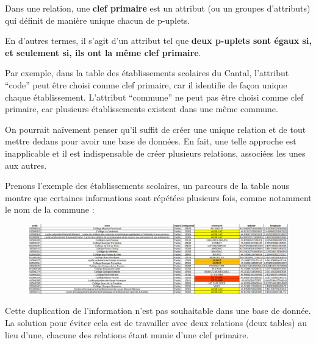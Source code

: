 \documentclass[
  a4paper,
  DIV=11,
  numbers=noendperiod]{scrartcl}
\begin{document}
\begin{tcolorbox}[enhanced jigsaw, opacityback=0, leftrule=.75mm, toptitle=1mm, toprule=.15mm, arc=.35mm, rightrule=.15mm, bottomtitle=1mm, title=\textcolor{quarto-callout-tip-color}{\faLightbulb}\hspace{0.5em}{Définition}, colbacktitle=quarto-callout-tip-color!10!white, titlerule=0mm, coltitle=black, left=2mm, opacitybacktitle=0.6, bottomrule=.15mm, breakable, colback=white]

Dans une relation, une \textbf{clef primaire} est un attribut (ou un
groupes d'attributs) qui définit de manière unique chacun de p-uplets.

\end{tcolorbox}

En d'autres termes, il s'agit d'un attribut tel que \textbf{deux
p-uplets sont égaux si, et seulement si, ils ont la même clef primaire}.

Par exemple, dans la table des établissements scolaires du Cantal,
l'attribut ``code'' peut être choisi comme clef primaire, car il
identifie de façon unique chaque établissement. L'attribut ``commune''
ne peut pas être choisi comme clef primaire, car plusieurs
établissements existent dans une même commune.

On pourrait naïvement penser qu'il suffit de créer une unique relation
et de tout mettre dedans pour avoir une base de données. En fait, une
telle approche est inapplicable et il est indispensable de créer
plusieurs relations, associées les unes aux autres.

Prenons l'exemple des établissements scolaires, un parcours de la table
nous montre que certaines informations sont répétées plusieurs fois,
comme notamment le nom de la commune :

\begin{figure}

{\centering \includegraphics{BDD6.png}

}

\end{figure}

Cette duplication de l'information n'est pas souhaitable dans une base
de donnée. La solution pour éviter cela est de travailler avec deux
relations (deux tables) au lieu d'une, chacune des relations étant munie
d'une clef primaire.
\end{document}
